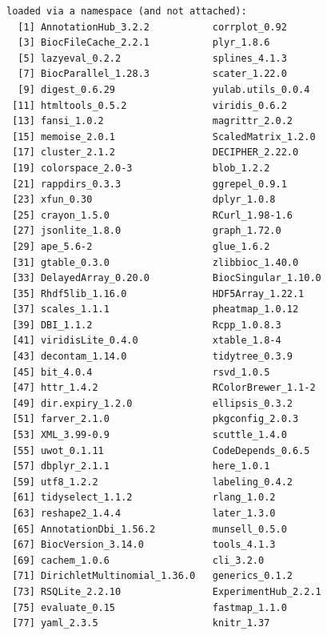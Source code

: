 \documentclass[
]{book}
\begin{document}
\begin{verbatim}
loaded via a namespace (and not attached):
  [1] AnnotationHub_3.2.2           corrplot_0.92                
  [3] BiocFileCache_2.2.1           plyr_1.8.6                   
  [5] lazyeval_0.2.2                splines_4.1.3                
  [7] BiocParallel_1.28.3           scater_1.22.0                
  [9] digest_0.6.29                 yulab.utils_0.0.4            
 [11] htmltools_0.5.2               viridis_0.6.2                
 [13] fansi_1.0.2                   magrittr_2.0.2               
 [15] memoise_2.0.1                 ScaledMatrix_1.2.0           
 [17] cluster_2.1.2                 DECIPHER_2.22.0              
 [19] colorspace_2.0-3              blob_1.2.2                   
 [21] rappdirs_0.3.3                ggrepel_0.9.1                
 [23] xfun_0.30                     dplyr_1.0.8                  
 [25] crayon_1.5.0                  RCurl_1.98-1.6               
 [27] jsonlite_1.8.0                graph_1.72.0                 
 [29] ape_5.6-2                     glue_1.6.2                   
 [31] gtable_0.3.0                  zlibbioc_1.40.0              
 [33] DelayedArray_0.20.0           BiocSingular_1.10.0          
 [35] Rhdf5lib_1.16.0               HDF5Array_1.22.1             
 [37] scales_1.1.1                  pheatmap_1.0.12              
 [39] DBI_1.1.2                     Rcpp_1.0.8.3                 
 [41] viridisLite_0.4.0             xtable_1.8-4                 
 [43] decontam_1.14.0               tidytree_0.3.9               
 [45] bit_4.0.4                     rsvd_1.0.5                   
 [47] httr_1.4.2                    RColorBrewer_1.1-2           
 [49] dir.expiry_1.2.0              ellipsis_0.3.2               
 [51] farver_2.1.0                  pkgconfig_2.0.3              
 [53] XML_3.99-0.9                  scuttle_1.4.0                
 [55] uwot_0.1.11                   CodeDepends_0.6.5            
 [57] dbplyr_2.1.1                  here_1.0.1                   
 [59] utf8_1.2.2                    labeling_0.4.2               
 [61] tidyselect_1.1.2              rlang_1.0.2                  
 [63] reshape2_1.4.4                later_1.3.0                  
 [65] AnnotationDbi_1.56.2          munsell_0.5.0                
 [67] BiocVersion_3.14.0            tools_4.1.3                  
 [69] cachem_1.0.6                  cli_3.2.0                    
 [71] DirichletMultinomial_1.36.0   generics_0.1.2               
 [73] RSQLite_2.2.10                ExperimentHub_2.2.1          
 [75] evaluate_0.15                 fastmap_1.1.0                
 [77] yaml_2.3.5                    knitr_1.37                   

\end{verbatim}
\end{document}
